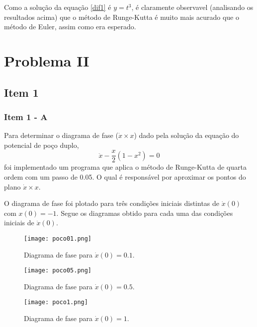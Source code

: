 \documentclass[a4paper,11pt, twoside]{article}
\begin{document}
    Como a solução da equação \eqref{dif1} é $y = t^3$, é claramente observavel (analisando os resultados acima)
    que o método de Runge-Kutta é muito mais acurado que o método de Euler, assim como era esperado.
    
    \section*{Problema II}
    \subsection*{Item 1}
    \subsubsection*{Item 1 - A}
    Para determinar o diagrama de fase ($\dot{x}\times x$)
    dado pela solução da equação do potencial de poço duplo,
    \begin{equation}\label{dif2}
        \ddot{x} - \frac{x}{2}(1 - x^2) = 0
    \end{equation}
    foi implementado um programa que aplica o método de Runge-Kutta de quarta ordem com um passo de 0.05.
    O qual é responsável por aproximar os pontos do plano $\dot{x}\times x$.
    
    O diagrama de fase foi plotado para três condições iniciais distintas de $\dot{x}(0)$ com $x(0) = -1$.
    Segue os diagramas obtido para cada uma das condições iniciais de $\dot{x}(0)$.
    \begin{figure}[!ht]
        \centering
        \texttt{[image: poco01.png]}
        \caption{Diagrama de fase para $\dot{x}(0) = 0.1$.\label{01}}
    \end{figure}
    \begin{figure}[!ht]
        \centering
        \texttt{[image: poco05.png]}
        \caption{Diagrama de fase para $\dot{x}(0) = 0.5$.\label{05}}
    \end{figure}
    \begin{figure}[!ht]
        \centering
        \texttt{[image: poco1.png]}
        \caption{Diagrama de fase para $\dot{x}(0) = 1$.\label{1}}
    \end{figure}
    
\end{document}
